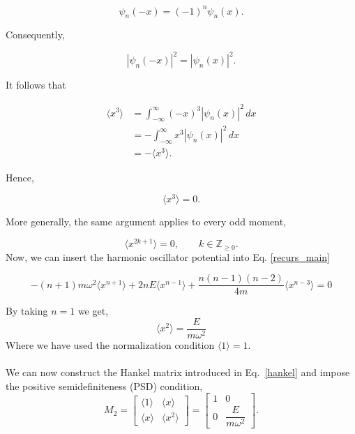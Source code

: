 \documentclass{article}
\theoremstyle{definition}
\begin{document}
\begin{equation}
    \psi_n(-x)=(-1)^n\psi_n(x).
\end{equation}

Consequently,

\begin{equation}
    |\psi_n(-x)|^{2}
    =
    |\psi_n(x)|^{2}.
\end{equation}

It follows that

\begin{align}
    \langle x^{3}\rangle
    &=
    \int_{-\infty}^{\infty}
    (-x)^{3}|\psi_n(x)|^{2}\,dx
    \\
    &=
    -\int_{-\infty}^{\infty}
    x^{3}|\psi_n(x)|^{2}\,dx
    \\
    &=
    -\langle x^{3}\rangle.
\end{align}

Hence,

\begin{equation}
    \langle x^{3}\rangle=0.
\end{equation}

More generally, the same argument applies to every odd moment,

\begin{equation}
    \boxed{
    \langle x^{2k+1}\rangle=0,
    \qquad
    k\in\mathbb{Z}_{\geq0}.
    }
\end{equation}
Now, we can insert the harmonic oscillator potential into Eq. \eqref{recurs_main}

\begin{equation}\label{harmonic_recurs}
        -(n+1)m\omega^{2}\langle x^{n+1} \rangle +2nE\langle x^{n-1}\rangle+ \frac{n(n-1)(n-2)}{4m} \langle x^{n-3}\rangle = 0
\end{equation}

By taking $n = 1$ we get, 
\begin{equation*}
    \langle x^{2} \rangle = \frac{E}{m\omega^{2}}
\end{equation*}
Where we have used the normalization condition \(\langle 1\rangle=1\). \\
\\
We can now construct the Hankel matrix introduced in Eq.~\eqref{hankel} and impose the positive semidefiniteness (PSD) condition,
\begin{equation}
M_{2}
=
\begin{bmatrix}
\langle 1\rangle & \langle x\rangle \\
\langle x\rangle & \langle x^{2}\rangle
\end{bmatrix}
=
\begin{bmatrix}
1 & 0 \\
0 & \dfrac{E}{m\omega^{2}}
\end{bmatrix}.
\end{equation}
\end{document}

